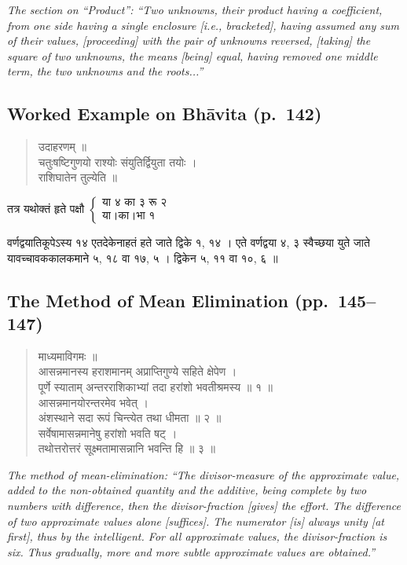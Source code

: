 \documentclass[11pt,a4paper]{article}
\newcommand{\cnote}[1]{\textcolor{notecolor}{\textit{#1}}}
\newcommand{\dev}[1]{{\devanagarifont #1}}
\newenvironment{sanskritverse}{%
  \begin{quote}
}{%
  \end{quote}
}
\begin{document}
\cnote{The section on ``Product'': ``Two unknowns, their product having a coefficient, from one side having a single enclosure [i.e., bracketed], having assumed any sum of their values, [proceeding] with the pair of unknowns reversed, [taking] the square of two unknowns, the means [being] equal, having removed one middle term, the two unknowns and the roots...''}

\subsection*{Worked Example on Bhāvita (p.\ 142)}

\begin{sanskritverse}
\dev{%
उदाहरणम् ॥\\[0.3em]
चतुःषष्टिगुणयो राश्योः संयुतिर्द्वियुता तयोः ।\\
राशिघातेन तुल्येति ॥}
\end{sanskritverse}

\dev{%
तत्र यथोक्तं हृते पक्षौ $\left\{ \begin{array}{l} \text{या ४ का ३ रू २} \\ \text{या।का।भा १} \end{array} \right.$}

\dev{%
वर्णद्वयातिकूपेऽस्य १४ एतदेकेनाहतं हते जाते द्विके १, १४ । एते वर्णद्वया ४, ३ स्वैच्छया युते जाते यावच्चावककालकमाने ५, १८ वा १७, ५ । द्विकेन ५, ११ वा १०, ६ ॥}

\subsection{The Method of Mean Elimination (pp.\ 145--147)}

\begin{sanskritverse}
\dev{%
माध्यमाविगमः ॥\\[0.5em]
आसन्नमानस्य हराशमानम् अप्राप्तिगुण्ये सहिते क्षेपेण ।\\
पूर्णे स्याताम् अन्तरराशिकाभ्यां तदा हरांशो भवतीश्रमस्य ॥ १ ॥\\[0.5em]
आसन्नमानयोरन्तरमेव भवेत् ।\\
अंशस्थाने सदा रूपं चिन्त्येत तथा धीमता ॥ २ ॥\\
सर्वेषामासन्नमानेषु हरांशो भवति षट् ।\\
तथोत्तरोत्तरं सूक्ष्मतामासन्नानि भवन्ति हि ॥ ३ ॥}
\end{sanskritverse}

\cnote{The method of mean-elimination: ``The divisor-measure of the approximate value, added to the non-obtained quantity and the additive, being complete by two numbers with difference, then the divisor-fraction [gives] the effort. The difference of two approximate values alone [suffices]. The numerator [is] always unity [at first], thus by the intelligent. For all approximate values, the divisor-fraction is six. Thus gradually, more and more subtle approximate values are obtained.''}
\end{document}
